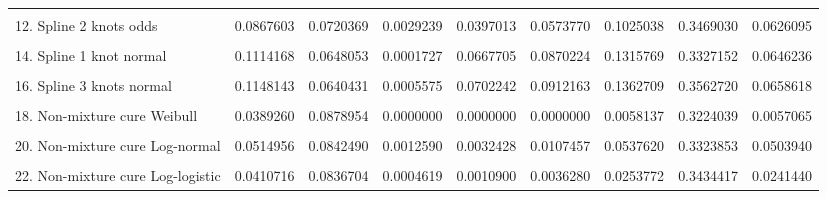 \documentclass[]{article}
\begin{document}
\begin{table}
\begin{tabular}[t]{lrrrrrrrr}
\cellcolor{gray!6}{11. Spline 1 knot odds} & \cellcolor{gray!6}{0.0828358} & \cellcolor{gray!6}{0.0722684} & \cellcolor{gray!6}{0.0040186} & \cellcolor{gray!6}{0.0370407} & \cellcolor{gray!6}{0.0534928} & \cellcolor{gray!6}{0.0956147} & \cellcolor{gray!6}{0.3493116} & \cellcolor{gray!6}{0.0583932}\\
12. Spline 2 knots odds & 0.0867603 & 0.0720369 & 0.0029239 & 0.0397013 & 0.0573770 & 0.1025038 & 0.3469030 & 0.0626095\\
\cellcolor{gray!6}{13. Spline 3 knots odds} & \cellcolor{gray!6}{0.0933644} & \cellcolor{gray!6}{0.0716684} & \cellcolor{gray!6}{0.0031346} & \cellcolor{gray!6}{0.0443526} & \cellcolor{gray!6}{0.0641665} & \cellcolor{gray!6}{0.1145082} & \cellcolor{gray!6}{0.3547245} & \cellcolor{gray!6}{0.0699417}\\
14. Spline 1 knot normal & 0.1114168 & 0.0648053 & 0.0001727 & 0.0667705 & 0.0870224 & 0.1315769 & 0.3327152 & 0.0646236\\
\cellcolor{gray!6}{15. Spline 2 knots normal} & \cellcolor{gray!6}{0.1011547} & \cellcolor{gray!6}{0.0666094} & \cellcolor{gray!6}{0.0003302} & \cellcolor{gray!6}{0.0575542} & \cellcolor{gray!6}{0.0758377} & \cellcolor{gray!6}{0.1164719} & \cellcolor{gray!6}{0.3361441} & \cellcolor{gray!6}{0.0587484}\\
16. Spline 3 knots normal & 0.1148143 & 0.0640431 & 0.0005575 & 0.0702242 & 0.0912163 & 0.1362709 & 0.3562720 & 0.0658618\\
\cellcolor{gray!6}{17. Mixture cure Weibull} & \cellcolor{gray!6}{0.0374953} & \cellcolor{gray!6}{0.0871122} & \cellcolor{gray!6}{0.0000000} & \cellcolor{gray!6}{0.0000000} & \cellcolor{gray!6}{0.0000000} & \cellcolor{gray!6}{0.0019526} & \cellcolor{gray!6}{0.3124571} & \cellcolor{gray!6}{0.0019062}\\
18. Non-mixture cure Weibull & 0.0389260 & 0.0878954 & 0.0000000 & 0.0000000 & 0.0000000 & 0.0058137 & 0.3224039 & 0.0057065\\
\cellcolor{gray!6}{19. Mixture cure Log-normal} & \cellcolor{gray!6}{0.0496395} & \cellcolor{gray!6}{0.0871508} & \cellcolor{gray!6}{0.0002039} & \cellcolor{gray!6}{0.0008353} & \cellcolor{gray!6}{0.0048810} & \cellcolor{gray!6}{0.0495432} & \cellcolor{gray!6}{0.3220204} & \cellcolor{gray!6}{0.0484359}\\
20. Non-mixture cure Log-normal & 0.0514956 & 0.0842490 & 0.0012590 & 0.0032428 & 0.0107457 & 0.0537620 & 0.3323853 & 0.0503940\\
\cellcolor{gray!6}{21. Mixture cure Log-logistic} & \cellcolor{gray!6}{0.0439682} & \cellcolor{gray!6}{0.0847543} & \cellcolor{gray!6}{0.0005930} & \cellcolor{gray!6}{0.0014141} & \cellcolor{gray!6}{0.0047437} & \cellcolor{gray!6}{0.0321531} & \cellcolor{gray!6}{0.3414361} & \cellcolor{gray!6}{0.0305649}\\
22. Non-mixture cure Log-logistic & 0.0410716 & 0.0836704 & 0.0004619 & 0.0010900 & 0.0036280 & 0.0253772 & 0.3434417 & 0.0241440\\
\bottomrule
\end{tabular}
\end{table}
\end{document}
